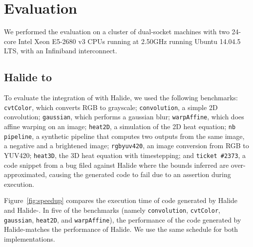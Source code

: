 
\section{Evaluation}

We performed the evaluation on a cluster of dual-socket machines with two 24-core Intel Xeon E5-2680 v3 CPUs running at 2.50GHz running Ubuntu 14.04.5 LTS, with an Infiniband interconnect.

\vspace{-0.25cm}
\subsection{Halide to \framework{}}

To evaluate the integration of \framework{} with Halide, we used the following benchmarks: \texttt{cvtColor}, which converts RGB to grayscale; \texttt{convolution}, a simple 2D convolution;  \texttt{gaussian}, which performs a gaussian blur; \texttt{warpAffine}, which does affine warping on an image;  \texttt{heat2D}, a simulation of the 2D heat equation; \texttt{nb pipeline}, a synthetic pipeline that computes two outputs from the same image, a negative and a brightened image;  \texttt{rgbyuv420}, an image conversion from RGB to YUV420; \texttt{heat3D}, the 3D heat equation with timestepping; and \texttt{ticket \#2373}, a code snippet from a bug filed against Halide where the bounds inferred are over-approximated, causing the generated code to fail due to an assertion during execution.





Figure~\ref{fig:speedup} compares the execution time of code generated by Halide  and Halide-\framework{}.
In five of the benchmarks (namely \texttt{convolution}, \texttt{cvtColor}, \texttt{gaussian}, \texttt{heat2D}, and \texttt{warpAffine}), the performance of the code generated by Halide-\framework matches the performance of Halide.  We use the same schedule for both implementations.

